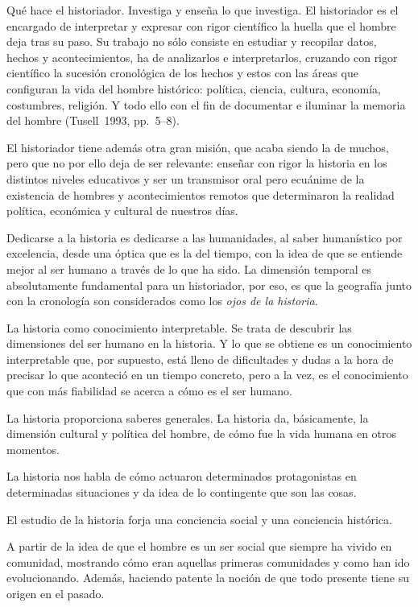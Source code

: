  
Qué hace el historiador. Investiga y enseña lo que investiga. El 
historiador es el encargado de interpretar y expresar con rigor 
científico la huella que el hombre deja tras su paso. Su trabajo no 
sólo consiste en estudiar y recopilar datos, hechos y acontecimientos, 
ha de analizarlos e interpretarlos, cruzando con rigor científico la 
sucesión cronológica de los hechos y estos con las áreas que configuran 
la vida del hombre histórico: política, ciencia, cultura, economía, 
costumbres, religión. Y todo ello con el fin de documentar e iluminar 
la memoria del hombre (Tusell~1993, pp.~5--8).

 
El historiador tiene además otra gran misión, que acaba siendo la de 
muchos, pero que no por ello deja de ser relevante: enseñar con rigor 
la historia en los distintos niveles educativos y ser un transmisor 
oral pero ecuánime de la existencia de hombres y acontecimientos 
remotos que determinaron la realidad política, económica y cultural de 
nuestros días.

 
Dedicarse a la historia es dedicarse a las humanidades, al saber 
humanístico por excelencia, desde una óptica  que es la del tiempo, con 
la idea de que se entiende mejor al ser humano a través de lo que ha 
sido. La dimensión temporal es absolutamente fundamental para un 
historiador, por eso, es que la geografía junto con la cronología son  
considerados como los \textit{ojos de la historia}.

 
La historia como conocimiento interpretable. Se trata de descubrir las 
dimensiones del ser humano en la historia. Y lo que se obtiene es un 
conocimiento interpretable que, por supuesto, está lleno de 
\mbox{dificultades} y dudas a la hora de precisar lo que aconteció en un 
tiempo concreto, pero a la vez, es el conocimiento que con más 
fiabilidad se acerca a cómo es el ser humano.

 
La historia proporciona saberes generales. La historia da, básicamente, 
la dimensión cultural y política del hombre, de cómo fue la vida humana 
en otros momentos.

 
La historia nos habla de cómo actuaron determinados protagonistas en
determinadas situaciones y da idea de lo contingente que son las cosas.

 
El estudio de la historia  forja una conciencia social y una conciencia
histórica.

 
A partir de la idea de que el hombre es un ser social que siempre ha 
vivido en comunidad, mostrando cómo eran aquellas primeras comunidades 
y como han ido evolucionando. Además, haciendo patente la noción de que 
todo presente tiene su origen en el pasado. 

